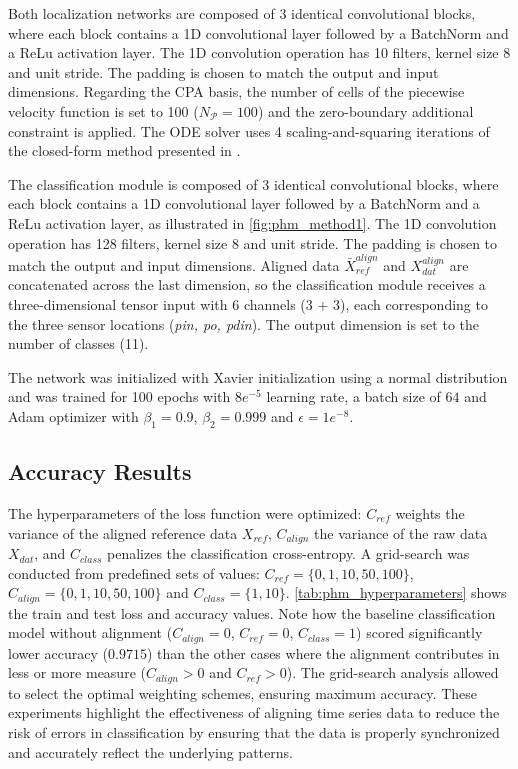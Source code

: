 Both localization networks are composed of 3 identical convolutional blocks, where each block contains a 1D convolutional layer followed by a BatchNorm and a ReLu activation layer. The 1D convolution operation has 10 filters, kernel size 8 and unit stride. The padding is chosen to match the output and input dimensions.
Regarding the CPA basis, the number of cells of the piecewise velocity function is set to 100 ($N_{\mathcal{P}}=100$) and the zero-boundary additional constraint is applied. The ODE solver uses 4 scaling-and-squaring iterations of the closed-form method presented in \cite{martinez2022closed}.

The classification module is composed of 3 identical convolutional blocks, where each block contains a 1D convolutional layer followed by a BatchNorm and a ReLu activation layer, as illustrated in \cref{fig:phm_method1}. The 1D convolution operation has 128 filters, kernel size 8 and unit stride. The padding is chosen to match the output and input dimensions. Aligned data $\bar{X}_{ref}^{align}$ and $X_{dat}^{align}$ are concatenated across the last dimension, so the classification module receives a three-dimensional tensor input with 6 channels (3 + 3), each corresponding to the three sensor locations (\textit{pin, po, pdin}). The output dimension is set to the number of classes (11).

The network was initialized with Xavier initialization \cite{glorot2010understanding} using a normal distribution and was trained for 100 epochs with $8e^{-5}$ learning rate, a batch size of $64$ and Adam \cite{kingma2014adam} optimizer with $\beta_{1}=0.9$, $\beta_{2}=0.999$ and $\epsilon=1e^{-8}$.

\subsection{Accuracy Results}
The hyperparameters of the loss function were optimized: $C_{ref}$ weights the variance of the aligned reference data $X_{ref}$, $C_{align}$ the variance of the raw data $X_{dat}$, and $C_{class}$ penalizes the classification cross-entropy. A grid-search was conducted from predefined sets of values: $C_{ref}=\{0,1,10,50,100\}$, $C_{align}=\{0,1,10,50,100\}$ and $C_{class}=\{1,10\}$.
\cref{tab:phm_hyperparameters} shows the train and test loss and accuracy values. Note how the baseline classification model without alignment ($C_{align}=0$, $C_{ref}=0$, $C_{class}=1$) scored significantly lower accuracy ($0.9715$) than the other cases where the alignment contributes in less or more measure ($C_{align}>0$ and $C_{ref}>0$). 
The grid-search analysis allowed to select the optimal weighting schemes, ensuring maximum accuracy. 
These experiments highlight the effectiveness of aligning time series data to reduce the risk of errors in classification by ensuring that the data is properly synchronized and accurately reflect the underlying patterns.



